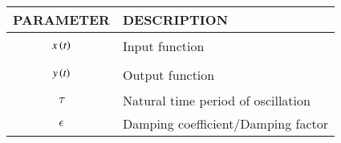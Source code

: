 \begin{tabular}{|p{3cm}|p{5cm}|}
    \hline
    PARAMETER & DESCRIPTION   \\ \hline
    $$x\left(t\right)$$ & Input function  \\ \hline
    $$y\left(t\right)$$ & Output function \\ \hline
    $$\tau$$ & Natural time period of oscillation  \\ \hline
    $$\epsilon$$ & Damping coefficient/Damping factor  \\ \hline
\end{tabular}
